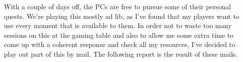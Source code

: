 With a couple of days off, the PCs are free to pursue some of their personal quests. We're playing this mostly ad lib, as I've found that my players want to use every moment that is available to them. In order not to waste too many sessions on this at the gaming table and also to allow me some extra time to come up with a coherent response and check all my resources, I've decided to play out part of this by mail. The following report is the result of these mails. 